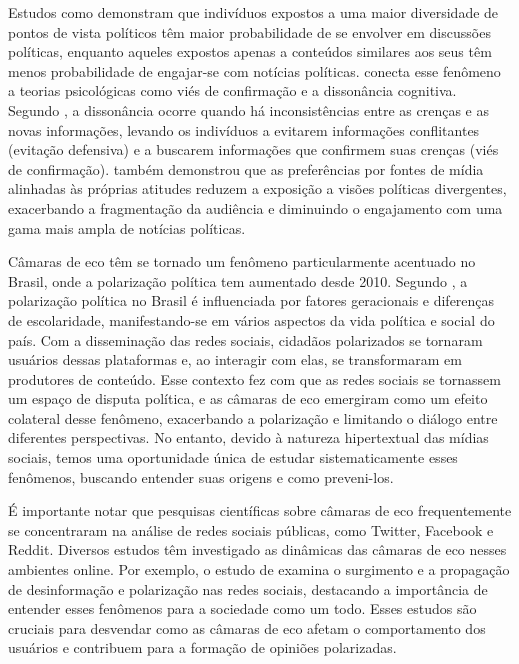 Estudos como  demonstram que indivíduos expostos a uma maior diversidade de pontos de vista políticos têm maior probabilidade de se envolver em discussões políticas, enquanto aqueles expostos apenas a conteúdos similares aos seus têm menos probabilidade de engajar-se com notícias políticas.  conecta esse fenômeno a teorias psicológicas como viés de confirmação e a dissonância cognitiva. Segundo , a dissonância ocorre quando há inconsistências entre as crenças e as novas informações, levando os indivíduos a evitarem informações conflitantes (evitação defensiva) e a buscarem informações que confirmem suas crenças (viés de confirmação).  também demonstrou que as preferências por fontes de mídia alinhadas às próprias atitudes reduzem a exposição a visões políticas divergentes, exacerbando a fragmentação da audiência e diminuindo o engajamento com uma gama mais ampla de notícias políticas.

Câmaras de eco têm se tornado um fenômeno particularmente acentuado no Brasil, onde a polarização política tem aumentado desde 2010. Segundo , a polarização política no Brasil é influenciada por fatores geracionais e diferenças de escolaridade, manifestando-se em vários aspectos da vida política e social do país. Com a disseminação das redes sociais, cidadãos polarizados se tornaram usuários dessas plataformas e, ao interagir com elas, se transformaram em produtores de conteúdo. Esse contexto fez com que as redes sociais se tornassem um espaço de disputa política, e as câmaras de eco emergiram como um efeito colateral desse fenômeno, exacerbando a polarização e limitando o diálogo entre diferentes perspectivas. No entanto, devido à natureza hipertextual das mídias sociais, temos uma oportunidade única de estudar sistematicamente esses fenômenos, buscando entender suas origens e como preveni-los.

É importante notar que pesquisas científicas sobre câmaras de eco frequentemente se concentraram na análise de redes sociais públicas, como Twitter, Facebook e Reddit. Diversos estudos têm investigado as dinâmicas das câmaras de eco nesses ambientes online. Por exemplo, o estudo de  examina o surgimento e a propagação de desinformação e polarização nas redes sociais, destacando a importância de entender esses fenômenos para a sociedade como um todo. Esses estudos são cruciais para desvendar como as câmaras de eco afetam o comportamento dos usuários e contribuem para a formação de opiniões polarizadas.

